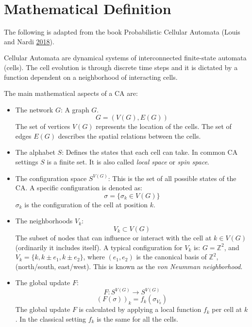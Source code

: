 \documentclass[
  12pt,
  openany]{book}
\begin{document}
\hypertarget{mathematical-definition}{%
\section{Mathematical Definition}\label{mathematical-definition}}

The following is adapted from the book Probabilistic Cellular Automata (Louis and Nardi \protect\hyperlink{ref-louis2018probabilistic}{2018}).

Cellular Automata are dynamical systems of interconnected finite-state automata (cells). The cell evolution is through discrete time steps and it is dictated by a function dependent on a neighborhood of interacting cells.

The main mathematical aspects of a CA are:

\begin{itemize}
\item
  The network \(G\):
  A graph \(G\).
  \[ G = (V(G), E(G)) \]
  The set of vertices \(V(G)\) represents the location of the cells. The set of edges \(E(G)\) describes the spatial relations between the cells.
\item
  The alphabet \(S\):
  Defines the states that each cell can take. In common CA settings \(S\) is a finite set. It is also called \emph{local space} or \emph{spin space}.
\item
  The configuration space \(S^{V(G)}\):
  This is the set of all possible states of the CA. A specific configuration is denoted as:
  \[ \sigma = \{\sigma_k \in V(G)\} \]
  \(\sigma_k\) is the configuration of the cell at position \(k\).
\item
  The neighborhoods \(V_k\):
  \[ V_k \subset  V(G) \]
  The subset of nodes that can influence or interact with the cell at \(k \in V(G)\) (ordinarily it includes itself). A typical configuration for \(V_k\) is: \(G = \mathds{Z}^2\), and \(V_k = \{k, k \pm e_1, k \pm e_2\}\), where \((e_1, e_2)\) is the canonical basis of \(\mathds{Z}^2\), (north/south, east/west). This is known as the \emph{von Neumman neighborhood}.
\item
  The global update \(F\):
  \[ F: S^{V(G)} \rightarrow S^{V(G)} \]
  \[ (F(\sigma))_k = f_k(\sigma_{V_k}) \]
  The global update \(F\) is calculated by applying a local function \(f_k\) per cell at \(k\). In the classical setting \(f_k\) is the same for all the cells.
\end{itemize}
\end{document}
